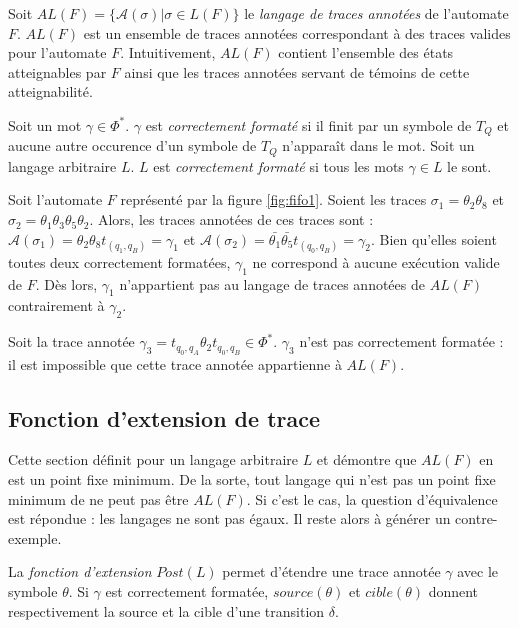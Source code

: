 Soit $AL(F)=\{\mathcal{A}(\sigma)|\sigma \in L(F)\}$ le \emph{langage de traces annotées} de l'automate $F$. $AL(F)$ est un ensemble de traces annotées correspondant à des traces valides pour l'automate $F$. Intuitivement, $AL(F)$ contient l'ensemble des états atteignables par $F$ ainsi que les traces annotées servant de témoins de cette atteignabilité.

Soit un mot $\gamma \in \Phi^*$. $\gamma$ est \emph{correctement formaté} si il finit par un symbole de $T_Q$ et aucune autre occurence d'un symbole de $T_Q$ n'apparaît dans le mot. Soit un langage arbitraire $L$. $L$ est \emph{correctement formaté} si tous les mots $\gamma\in L$ le sont.


\begin{example}
Soit l'automate $F$ représenté par la figure \ref{fig:fifo1}. Soient les traces $\sigma_1=\theta_2\theta_8$ et $\sigma_2=\theta_1\theta_3\theta_5\theta_2$. Alors, les traces annotées de ces traces sont : $\mathcal{A}(\sigma_1)=\theta_2\theta_8t_{(q_1,q_B)}=\gamma_1$ et $\mathcal{A}(\sigma_2)=\bar{\theta_1}\bar{\theta_5}t_{(q_0,q_B)}=\gamma_2$.
Bien qu'elles soient toutes deux correctement formatées, $\gamma_1$ ne correspond à aucune exécution valide de $F$. Dès lors, $\gamma_1$ n'appartient pas au langage de traces annotées de $AL(F)$ contrairement à $\gamma_2$.

Soit la trace annotée $\gamma_3=t_{q_0,q_A}\theta_2 t_{q_0,q_B} \in \Phi^*$. $\gamma_3$ n'est pas correctement formatée : il est impossible que cette trace annotée appartienne à $AL(F)$.
\end{example}



\subsection{Fonction d'extension de trace}\label{trace:extension}

Cette section définit \fl pour un langage arbitraire $L$ et démontre que $AL(F)$ en est un point fixe minimum. De la sorte, tout langage qui n'est pas un point fixe minimum de \fl ne peut pas être $AL(F)$. Si c'est le cas, la question d'équivalence est répondue : les langages ne sont pas égaux. Il reste alors à générer un contre-exemple.

La \emph{fonction d'extension} $Post(L)$ permet d'étendre une trace annotée $\gamma$ avec le symbole $\theta$. Si $\gamma$ est correctement formatée, $source(\theta)$ et $cible(\theta)$ donnent respectivement la source et la cible d'une transition $\delta$.

